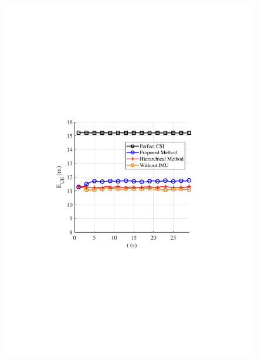 \documentclass[journal,12pt,onecolumn,draftclsnofoot,]{IEEEtran}
\begin{document}
\begin{figure}
{\hspace{-6mm}\includegraphics[scale=0.46]{9-2.pdf}\hspace{-7mm}
}
\quad
\subfloat[]{
}
\end{figure}
\end{document}
